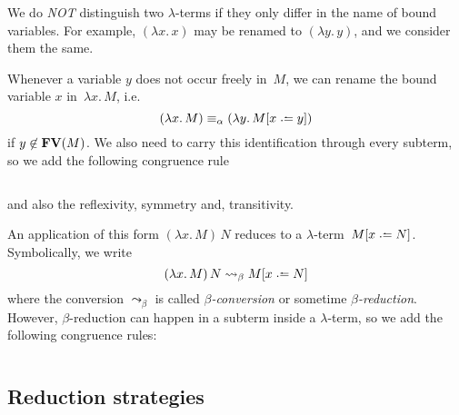 \begin{convention}
  We do \emph{NOT} distinguish two $\lambda$-terms if they only differ in the
  name of bound variables. For example, $(\lambda x.\, x)$ may be renamed to 
  $(\lambda y.\, y)$, and we consider them the same.
\end{convention}
\begin{definition}
  Whenever a variable $y$ does not occur freely in~$M$, we can rename the bound
  variable $x$ in~$\lambda x.\, M$, i.e.\ 
  \[
    (\lambda x.\, M) \equiv_\alpha (\lambda y.\, M\subst{x}{y})
  \]
  if $y \not\in \mathbf{FV}(M)$. We also need to carry this identification through every
  subterm, so we add the following congruence rule
  \begin{columns}
    \begin{prooftree}
    \end{prooftree}
    \begin{prooftree}
    \end{prooftree}
  \end{columns}
  and also the reflexivity, symmetry and, transitivity.
\end{definition}
\begin{definition}
  An application of this form $(\lambda x.\, M)\, N$ reduces to a
  $\lambda$-term~$M\subst{x}{N}$. Symbolically, we write 
  \[
    (\lambda x.\, M)\, N \leadsto_\beta M\subst{x}{N}
  \]
  where the conversion $\leadsto_\beta$ is called \emph{$\beta$-conversion} or
  sometime \emph{$\beta$-reduction}. However, $\beta$-reduction can happen in
  a subterm inside a $\lambda$-term, so we add the following congruence rules:
  \begin{columns}
    \begin{prooftree}
    \end{prooftree}
    \begin{prooftree}
    \end{prooftree}
  \end{columns}
\end{definition}
\subsection{Reduction strategies}
